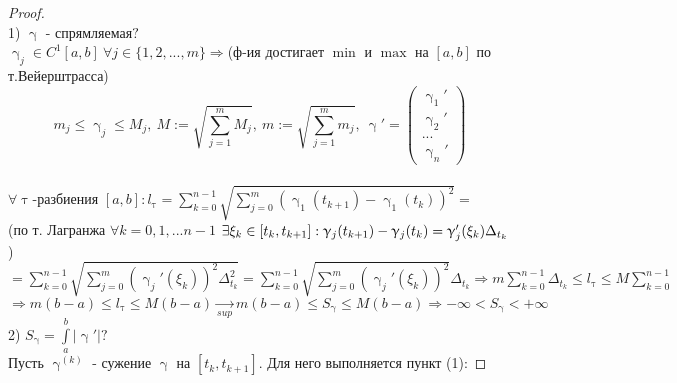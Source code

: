 \documentclass[11pt, fleqn]{article}
\begin{document}
\begin{Property}[3]
\begin{Property}[4]
\begin{Property}[2, аддитивность]
\begin{Proof}
\begin{proof}
    \\
    1) $\upgamma$ - спрямляемая$?$
    \\
    $\upgamma_j \in C^1[a,b]\ \forall j \in \{1,2,...,m\} \Rightarrow$(ф-ия достигает $\min$ и $\max$ на $[a,b]$ по т.Вейерштрасса) 
    $$m_j \leqslant \upgamma_j \leqslant M_j,\ M := \sqrt{\sum\limits_{j=1}^m M_j},\ m := \sqrt{\sum\limits_{j=1}^m m_j},\ \upgamma' = \begin{pmatrix}
      \upgamma_1'\\
      \upgamma_2'\\
      ...\\
      \upgamma_n'
    \end{pmatrix}$$
    \\
    $\forall \uptau$-разбиения $[a,b]: l_\uptau = \sum\limits_{k=0}^{n-1} \sqrt{\sum\limits_{j=0}^m (\upgamma_1(t_{k+1}) - \upgamma_1(t_k))^2} = $
    \\
    (по т. Лагранжа $\forall k = 0,1,...n-1$ $\exists \xi_k \in [t_k, t_{k+1}]: \upgamma_j(t_{k+1}) - \upgamma_j(t_k) = \upgamma_j'(\xi_k) \Delta_{t_k}$)
    \\
    $= \sum\limits_{k=0}^{n-1} \sqrt{\sum\limits_{j=0}^m (\upgamma_j'(\xi_k))^2 \Delta_{t_k}^2} = \sum\limits_{k=0}^{n-1} \sqrt{\sum\limits_{j=0}^m (\upgamma_j'(\xi_k))^2} \Delta_{t_k} \Rightarrow m \sum\limits_{k=0}^{n-1} \Delta_{t_k} \leqslant l_\uptau \leqslant M \sum\limits_{k=0}^{n-1}$
    \\
    $\Rightarrow m (b-a) \leqslant l_\uptau \leqslant M (b-a) \underset{sup}{\rightarrow} m (b-a) \leqslant S_\upgamma \leqslant M (b-a) \Rightarrow -\infty < S_\upgamma < +\infty$ 
    \\
    2) $S_{\upgamma} = \int\limits_a^b |\upgamma'|?$
    \\
    Пусть $\upgamma^{(k)}$ - сужение $\upgamma$ на $[t_k,t_{k+1}]$. Для него выполняется пункт (1):
    

\end{proof}
\end{Proof}
\end{Property}
\end{Property}
\end{Property}
\end{document}
